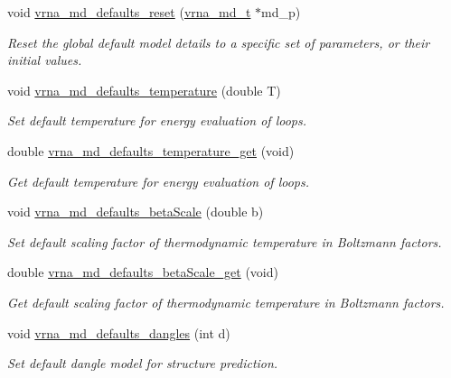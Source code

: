 \begin{DoxyCompactItemize}
void \hyperlink{group__model__details_ga70834424cf804d149937de89f80ceb45}{vrna\+\_\+md\+\_\+defaults\+\_\+reset} (\hyperlink{group__model__details_ga1f8a10e12a0a1915f2a4eff0b28ea17c}{vrna\+\_\+md\+\_\+t} $\ast$md\+\_\+p)
\begin{DoxyCompactList}\small\item\em Reset the global default model details to a specific set of parameters, or their initial values. \end{DoxyCompactList}\item 
void \hyperlink{group__model__details_gaf9e527e9a2f7e6fd6e42bc6e602f5445}{vrna\+\_\+md\+\_\+defaults\+\_\+temperature} (double T)
\begin{DoxyCompactList}\small\item\em Set default temperature for energy evaluation of loops. \end{DoxyCompactList}\item 
double \hyperlink{group__model__details_ga96b24a74437f9ba46c4e06343155bf46}{vrna\+\_\+md\+\_\+defaults\+\_\+temperature\+\_\+get} (void)
\begin{DoxyCompactList}\small\item\em Get default temperature for energy evaluation of loops. \end{DoxyCompactList}\item 
void \hyperlink{group__model__details_gae984567db36c3f9b8731ecc917abf3a2}{vrna\+\_\+md\+\_\+defaults\+\_\+beta\+Scale} (double b)
\begin{DoxyCompactList}\small\item\em Set default scaling factor of thermodynamic temperature in Boltzmann factors. \end{DoxyCompactList}\item 
double \hyperlink{group__model__details_gabb8780f5410c52f970d75b044059bd09}{vrna\+\_\+md\+\_\+defaults\+\_\+beta\+Scale\+\_\+get} (void)
\begin{DoxyCompactList}\small\item\em Get default scaling factor of thermodynamic temperature in Boltzmann factors. \end{DoxyCompactList}\item 
void \hyperlink{group__model__details_gac76a5374def8e5e4e644ff6e4cc72dee}{vrna\+\_\+md\+\_\+defaults\+\_\+dangles} (int d)
\begin{DoxyCompactList}\small\item\em Set default dangle model for structure prediction. \end{DoxyCompactList}\item 

\end{DoxyCompactItemize}
